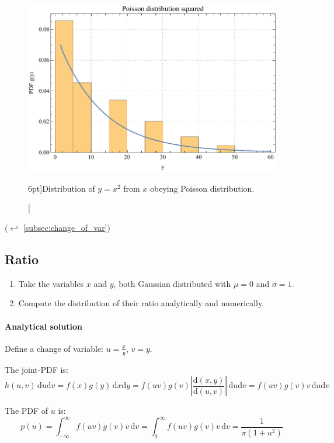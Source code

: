 \begin{figure}
	\includegraphics{exercise/change_of_var_Poisson_squared.pdf}
	\caption[Distribution of $y = x^{2}$ from $x$ obeying Poisson distribution.][6pt]{Distribution of $y = x^{2}$ from $x$ obeying Poisson distribution.}
	\label{fig:change_of_var_Poisson_squared}
\end{figure}

($\hookleftarrow$ \ref{subsec:change_of_var})

\newpage

\subsection{Ratio}
\label{exer:change_of_var_ratio}

\begin{enumerate}
	\item Take the variables $x$ and $y$, both Gaussian distributed with $\mu = 0$ and $\sigma = 1$.
	\item Compute the distribution of their ratio analytically and numerically.
\end{enumerate}

\paragraph{Analytical solution}

\begin{description}
	\item Define a change of variable: $u = \frac{x}{y}$, $v = y$.
	\item The joint-PDF is:
		$$
		h(u, v) \,\mathrm{d}u \mathrm{d}v = f(x) g(y) \,\mathrm{d}x \mathrm{d}y 
		= f(uv) g(v) \left| \frac{\mathrm{d}(x, y)}{\mathrm{d}(u, v)}\right| \,\mathrm{d}u \mathrm{d}v 
		= f(uv) g(v) v \,\mathrm{d}u \mathrm{d}v
		$$
	\item The PDF of $u$ is:
		$$
		p(u) = \int_{-\infty}^{\infty} {f(uv)g(v)v} \,\mathrm{d}v 
		= \int_{0}^{\infty} {f(uv)g(v)v} \,\mathrm{d}v 
		= \frac{1}{\pi (1 + u^{2})}
		$$
\end{description}

